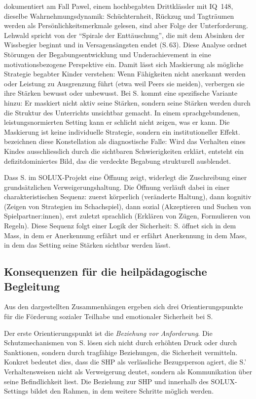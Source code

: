 \documentclass[ngerman, a4paper]{article}
\begin{document}
\textcite[S.\,57--63]{lehwald2017motivation} dokumentiert am Fall Pawel, einem
hochbegabten Drittklässler mit IQ~148, dieselbe Wahrnehmungsdynamik:
Schüchternheit, Rückzug und Tagträumen werden als Persönlichkeitsmerkmale
gelesen, sind aber Folge der Unterforderung. Lehwald spricht von der
\enquote{Spirale der Enttäuschung}, die mit dem Absinken der Wissbegier
beginnt und in Versagensängsten endet (S.\,63). Diese Analyse ordnet
Störungen der Begabungsentwicklung und Underachievement in eine
motivationsbezogene Perspektive ein. Damit lässt sich
Maskierung als mögliche Strategie begabter Kinder verstehen: Wenn Fähigkeiten nicht
anerkannt werden oder Leistung zu Ausgrenzung führt (etwa weil Peers sie meiden),
verbergen sie ihre Stärken bewusst oder unbewusst. Bei S. kommt eine spezifische Variante hinzu: Er maskiert nicht
aktiv seine Stärken, sondern seine Stärken werden durch die Struktur des Unterrichts
unsichtbar gemacht. In einem sprachgebundenen, leistungsnormierten Setting kann er
schlicht nicht zeigen, was er kann. Die Maskierung ist keine individuelle Strategie,
sondern ein institutioneller Effekt.
\textcite[S.\,87--94]{webb2020doppeldiagnosen} bezeichnen diese Konstellation als
diagnostische Falle: Wird das Verhalten eines Kindes ausschliesslich durch
die sichtbaren Schwierigkeiten erklärt, entsteht ein defizitdominiertes Bild,
das die verdeckte Begabung strukturell ausblendet.

Dass S. im SOLUX-Projekt eine Öffnung zeigt, widerlegt die Zuschreibung einer
grundsätzlichen Verweigerungshaltung. Die Öffnung verläuft dabei in einer
charakteristischen Sequenz: zuerst körperlich (veränderte Haltung), dann kognitiv
(Zeigen von Strategien im Schachspiel), dann sozial (Akzeptieren und Suchen von
Spielpartner:innen), erst zuletzt sprachlich (Erklären von Zügen, Formulieren von
Regeln). Diese Sequenz folgt einer Logik der Sicherheit: S. öffnet sich
in dem Mass, in dem er Anerkennung erfährt und er erfährt Anerkennung in dem Mass,
in dem das Setting seine Stärken sichtbar werden lässt.

\subsection{Konsequenzen für die heilpädagogische Begleitung}

Aus den dargestellten Zusammenhängen ergeben sich drei Orientierungspunkte für die
Förderung sozialer Teilhabe und emotionaler Sicherheit bei S.

Der erste Orientierungspunkt ist die \textit{Beziehung vor Anforderung}. Die
Schutzmechanismen von S. lösen sich nicht durch erhöhten Druck oder durch Sanktionen,
sondern durch tragfähige Beziehungen, die Sicherheit vermitteln. Konkret bedeutet
dies, dass die SHP als verlässliche Bezugsperson agiert, die S.' Verhaltensweisen
nicht als Verweigerung deutet, sondern als Kommunikation über seine Befindlichkeit
liest. Die Beziehung zur SHP und innerhalb des SOLUX-Settings bildet den Rahmen,
in dem weitere Schritte möglich werden.
\end{document}
